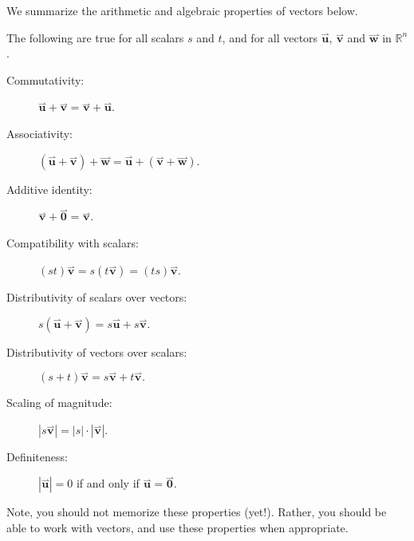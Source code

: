 \documentclass{ximera}
\begin{document}
We summarize the arithmetic and algebraic properties of vectors
below.

\begin{theorem}
The following are true for all scalars $s$ and $t$, and for all
vectors $\overset{\rightharpoonup}{\mathbf{u}}$, $\overset{\rightharpoonup}{\mathbf{v}}$ and $\overset{\rightharpoonup}{\mathbf{w}}$ in
$\mathbb{R}^n$.
\begin{description}
\item[Commutativity:] $\overset{\rightharpoonup}{\mathbf{u}}+\overset{\rightharpoonup}{\mathbf{v}} = \overset{\rightharpoonup}{\mathbf{v}}+\overset{\rightharpoonup}{\mathbf{u}}$.
\item[Associativity:] $(\overset{\rightharpoonup}{\mathbf{u}}+\overset{\rightharpoonup}{\mathbf{v}})+\overset{\rightharpoonup}{\mathbf{w}} = \overset{\rightharpoonup}{\mathbf{u}}+(\overset{\rightharpoonup}{\mathbf{v}}+\overset{\rightharpoonup}{\mathbf{w}})$.
\item[Additive identity:] $\overset{\rightharpoonup}{\mathbf{v}}+\overset{\rightharpoonup}{\mathbf{0}} = \overset{\rightharpoonup}{\mathbf{v}}$.
\item[Compatibility with scalars:] $(st)\overset{\rightharpoonup}{\mathbf{v}}= s(t\overset{\rightharpoonup}{\mathbf{v}}) = (ts)\overset{\rightharpoonup}{\mathbf{v}}$.
\item[Distributivity of scalars over vectors:] $s(\overset{\rightharpoonup}{\mathbf{u}}+\overset{\rightharpoonup}{\mathbf{v}}) = s\overset{\rightharpoonup}{\mathbf{u}}+s\overset{\rightharpoonup}{\mathbf{v}}$.
\item[Distributivity of vectors over scalars:] $(s+t)\overset{\rightharpoonup}{\mathbf{v}} = s\overset{\rightharpoonup}{\mathbf{v}}+t\overset{\rightharpoonup}{\mathbf{v}}.$
\item[Scaling of magnitude:] $|s\overset{\rightharpoonup}{\mathbf{v}}| = |s|\cdot|\overset{\rightharpoonup}{\mathbf{v}}|$.
\item[Definiteness:] $|\overset{\rightharpoonup}{\mathbf{u}}| = 0$ if and only if $\overset{\rightharpoonup}{\mathbf{u}} = \overset{\rightharpoonup}{\mathbf{0}}$.
\end{description}
\end{theorem}
Note, you should not memorize these properties (yet!). Rather, you should be
able to work with vectors, and use these properties when appropriate.
\end{document}

